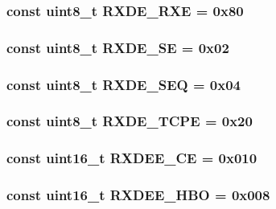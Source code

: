 \label{namespaceiGbReg_a0e09666185341c08fbc3e424f552eabf}
\hypertarget{namespaceiGbReg_aaced21efb464d65f048dcbc75508d930}{
\subsubsection[{RXDE\_\-RXE}]{\setlength{\rightskip}{0pt plus 5cm}const uint8\_\-t {\bf RXDE\_\-RXE} = 0x80}}
\label{namespaceiGbReg_aaced21efb464d65f048dcbc75508d930}
\hypertarget{namespaceiGbReg_a5825344f3dc6135dd18bedee9d37e0a3}{
\subsubsection[{RXDE\_\-SE}]{\setlength{\rightskip}{0pt plus 5cm}const uint8\_\-t {\bf RXDE\_\-SE} = 0x02}}
\label{namespaceiGbReg_a5825344f3dc6135dd18bedee9d37e0a3}
\hypertarget{namespaceiGbReg_a02358741d65ef3322dd25e1fe44bda83}{
\subsubsection[{RXDE\_\-SEQ}]{\setlength{\rightskip}{0pt plus 5cm}const uint8\_\-t {\bf RXDE\_\-SEQ} = 0x04}}
\label{namespaceiGbReg_a02358741d65ef3322dd25e1fe44bda83}
\hypertarget{namespaceiGbReg_a620a2faa51faca3544031f54ced87ca3}{
\subsubsection[{RXDE\_\-TCPE}]{\setlength{\rightskip}{0pt plus 5cm}const uint8\_\-t {\bf RXDE\_\-TCPE} = 0x20}}
\label{namespaceiGbReg_a620a2faa51faca3544031f54ced87ca3}
\hypertarget{namespaceiGbReg_aeb415972ea4ca7b155cc61d348ad2340}{
\subsubsection[{RXDEE\_\-CE}]{\setlength{\rightskip}{0pt plus 5cm}const uint16\_\-t {\bf RXDEE\_\-CE} = 0x010}}
\label{namespaceiGbReg_aeb415972ea4ca7b155cc61d348ad2340}
\hypertarget{namespaceiGbReg_a3c7498480684ea5f18a6caff1489d9e1}{
\subsubsection[{RXDEE\_\-HBO}]{\setlength{\rightskip}{0pt plus 5cm}const uint16\_\-t {\bf RXDEE\_\-HBO} = 0x008}}
